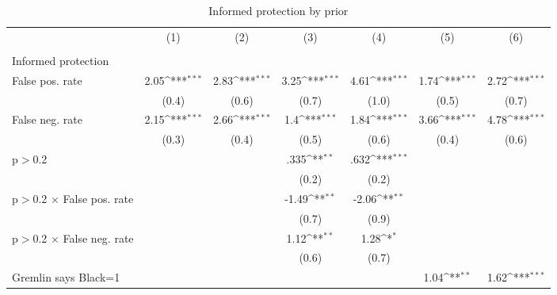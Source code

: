 \begin{table}[htbp]\centering
\def\sym#1{\ifmmode^{#1}\else\(^{#1}\)\fi}
\caption{Informed protection by prior}
\begin{tabular}{l*{6}{c}}
\hline\hline
                &\multicolumn{1}{c}{(1)}&\multicolumn{1}{c}{(2)}&\multicolumn{1}{c}{(3)}&\multicolumn{1}{c}{(4)}&\multicolumn{1}{c}{(5)}&\multicolumn{1}{c}{(6)}\\
                &\multicolumn{1}{c}{}&\multicolumn{1}{c}{}&\multicolumn{1}{c}{}&\multicolumn{1}{c}{}&\multicolumn{1}{c}{}&\multicolumn{1}{c}{}\\
\hline
Informed protection&                  &                  &                  &                  &                  &                  \\
False pos. rate &     2.05\sym{***}&     2.83\sym{***}&     3.25\sym{***}&     4.61\sym{***}&     1.74\sym{***}&     2.72\sym{***}\\
                &    (0.4)         &    (0.6)         &    (0.7)         &    (1.0)         &    (0.5)         &    (0.7)         \\
False neg. rate &     2.15\sym{***}&     2.66\sym{***}&      1.4\sym{***}&     1.84\sym{***}&     3.66\sym{***}&     4.78\sym{***}\\
                &    (0.3)         &    (0.4)         &    (0.5)         &    (0.6)         &    (0.4)         &    (0.6)         \\
p$>$0.2         &                  &                  &     .335\sym{**} &     .632\sym{***}&                  &                  \\
                &                  &                  &    (0.2)         &    (0.2)         &                  &                  \\
p$>$0.2 $\times$ False pos. rate&                  &                  &    -1.49\sym{**} &    -2.06\sym{**} &                  &                  \\
                &                  &                  &    (0.7)         &    (0.9)         &                  &                  \\
p$>$0.2 $\times$ False neg. rate&                  &                  &     1.12\sym{**} &     1.28\sym{*}  &                  &                  \\
                &                  &                  &    (0.6)         &    (0.7)         &                  &                  \\
Gremlin says Black=1&                  &                  &                  &                  &     1.04\sym{**} &     1.62\sym{***}\\

\end{tabular}
\end{table}
